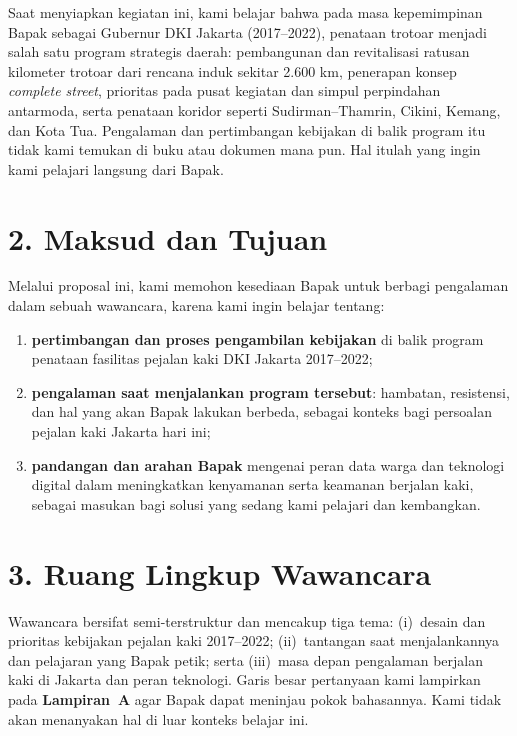 \documentclass[11pt,a4paper]{article}
\begin{document}
Saat menyiapkan kegiatan ini, kami belajar bahwa pada masa kepemimpinan Bapak sebagai Gubernur DKI Jakarta (2017--2022), penataan trotoar menjadi salah satu program strategis daerah: pembangunan dan revitalisasi ratusan kilometer trotoar dari rencana induk sekitar 2.600 km, penerapan konsep \textit{complete street}, prioritas pada pusat kegiatan dan simpul perpindahan antarmoda, serta penataan koridor seperti Sudirman--Thamrin, Cikini, Kemang, dan Kota Tua. Pengalaman dan pertimbangan kebijakan di balik program itu tidak kami temukan di buku atau dokumen mana pun. Hal itulah yang ingin kami pelajari langsung dari Bapak.

\newpage
\section*{2. Maksud dan Tujuan}

Melalui proposal ini, kami memohon kesediaan Bapak untuk berbagi pengalaman dalam sebuah wawancara, karena kami ingin belajar tentang:

\begin{enumerate}[label=\alph*., itemsep=2pt]
  \item \textbf{pertimbangan dan proses pengambilan kebijakan} di balik program penataan fasilitas pejalan kaki DKI Jakarta 2017--2022;
  \item \textbf{pengalaman saat menjalankan program tersebut}: hambatan, resistensi, dan hal yang akan Bapak lakukan berbeda, sebagai konteks bagi persoalan pejalan kaki Jakarta hari ini;
  \item \textbf{pandangan dan arahan Bapak} mengenai peran data warga dan teknologi digital dalam meningkatkan kenyamanan serta keamanan berjalan kaki, sebagai masukan bagi solusi yang sedang kami pelajari dan kembangkan.
\end{enumerate}

\section*{3. Ruang Lingkup Wawancara}

Wawancara bersifat semi-terstruktur dan mencakup tiga tema: (i)~desain dan prioritas kebijakan pejalan kaki 2017--2022; (ii)~tantangan saat menjalankannya dan pelajaran yang Bapak petik; serta (iii)~masa depan pengalaman berjalan kaki di Jakarta dan peran teknologi. Garis besar pertanyaan kami lampirkan pada \textbf{Lampiran~A} agar Bapak dapat meninjau pokok bahasannya. Kami tidak akan menanyakan hal di luar konteks belajar ini.
\end{document}
